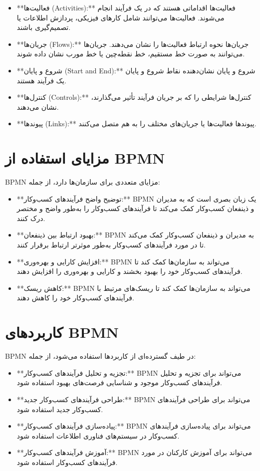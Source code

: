 \begin{itemize}
	\item **فعالیت‌ها (Activities):** فعالیت‌ها اقداماتی هستند که در یک فرآیند انجام می‌شوند. فعالیت‌ها می‌توانند شامل کارهای فیزیکی، پردازش اطلاعات یا تصمیم‌گیری باشند.
	\item **جریان‌ها (Flows):** جریان‌ها نحوه ارتباط فعالیت‌ها را نشان می‌دهند. جریان‌ها می‌توانند به صورت خط مستقیم، خط نقطه‌چین یا خط مورب نشان داده شوند.
	\item **شروع و پایان (Start and End):** شروع و پایان نشان‌دهنده نقاط شروع و پایان یک فرآیند هستند.
	\item **کنترل‌ها (Controls):** کنترل‌ها شرایطی را که بر جریان فرآیند تأثیر می‌گذارند، نشان می‌دهند.
	\item **پیوندها (Links):** پیوندها فعالیت‌ها یا جریان‌های مختلف را به هم متصل می‌کنند.
\end{itemize}

\section{مزایای استفاده از BPMN}

BPMN مزایای متعددی برای سازمان‌ها دارد، از جمله:

\begin{itemize}
	\item **توضیح واضح فرآیندهای کسب‌وکار:** BPMN یک زبان بصری است که به مدیران و ذینفعان کسب‌وکار کمک می‌کند تا فرآیندهای کسب‌وکار را به‌طور واضح و مختصر درک کنند.
	\item **بهبود ارتباط بین ذینفعان:** BPMN به مدیران و ذینفعان کسب‌وکار کمک می‌کند تا در مورد فرآیندهای کسب‌وکار به‌طور موثرتر ارتباط برقرار کنند.
	\item **افزایش کارایی و بهره‌وری:** BPMN می‌تواند به سازمان‌ها کمک کند تا فرآیندهای کسب‌وکار خود را بهبود بخشند و کارایی و بهره‌وری را افزایش دهند.
	\item **کاهش ریسک:** BPMN می‌تواند به سازمان‌ها کمک کند تا ریسک‌های مرتبط با فرآیندهای کسب‌وکار خود را کاهش دهند.
\end{itemize}

\section{کاربردهای BPMN}

BPMN در طیف گسترده‌ای از کاربردها استفاده می‌شود، از جمله:

\begin{itemize}
	\item **تجزیه و تحلیل فرآیندهای کسب‌وکار:** BPMN می‌تواند برای تجزیه و تحلیل فرآیندهای کسب‌وکار موجود و شناسایی فرصت‌های بهبود استفاده شود.
	\item **طراحی فرآیندهای کسب‌وکار جدید:** BPMN می‌تواند برای طراحی فرآیندهای کسب‌وکار جدید استفاده شود.
	\item **پیاده‌سازی فرآیندهای کسب‌وکار:** BPMN می‌تواند برای پیاده‌سازی فرآیندهای کسب‌وکار در سیستم‌های فناوری اطلاعات استفاده شود.
	\item **آموزش فرآیندهای کسب‌وکار:** BPMN می‌تواند برای آموزش کارکنان در مورد فرآیندهای کسب‌وکار استفاده شود.
\end{itemize}

